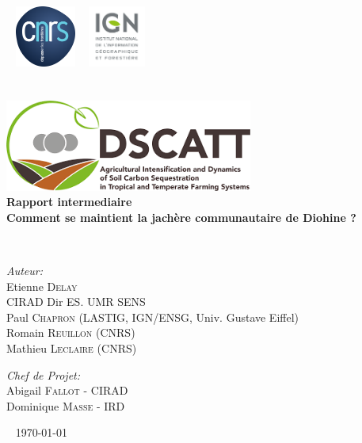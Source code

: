 \begin{titlepage}
\begin{center}

\logoCirad ~ \includegraphics[height=20mm]{./logo/cnrs.png} ~ \includegraphics[height=20mm]{./logo/ign.png}\\[4cm]


\textsc{\Large }\\[0.5cm]

\HRule \\[0.4cm]
\includegraphics[height=30mm]{./logo/DSCATT.png}\\
{\huge \bfseries Rapport intermediaire \\
 Comment se maintient la jachère communautaire de Diohine ? \\[0.4cm] }

\HRule \\[1.5cm]


\begin{minipage}{0.4\textwidth}
\begin{flushleft} \large
\emph{\textcolor{gris}{Auteur:}}\\
Etienne \textsc{Delay}\\
\textcolor{vert}{CIRAD Dir ES. UMR SENS}\\
Paul \textsc{Chapron} (LASTIG, IGN/ENSG, Univ. Gustave Eiffel)\\
Romain \textsc{Reuillon} (CNRS)\\
Mathieu \textsc{Leclaire} (CNRS)
\end{flushleft}
\end{minipage}
\begin{minipage}{0.4\textwidth}
\begin{flushright} \large
\emph{\textcolor{gris}{Chef de Projet:}} \\
Abigail \textsc{Fallot} - CIRAD\\
Dominique \textsc{Masse} - IRD
\end{flushright}
\end{minipage}

\vfill

\logoRF ~ \partnerFr
{\large \today}

\end{center}
\end{titlepage}
